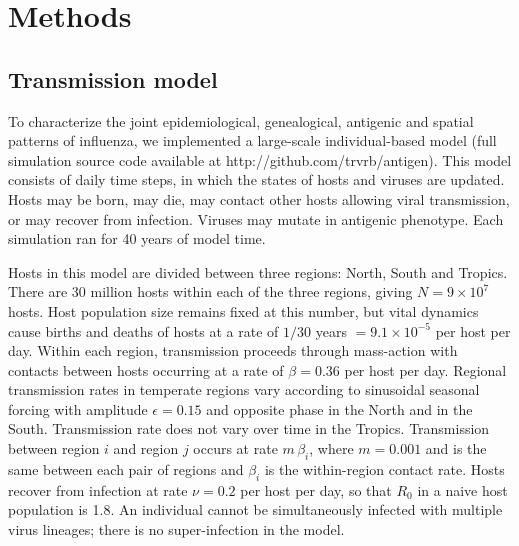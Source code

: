 \documentclass[11pt,oneside,letterpaper]{article}
\begin{document}
\section*{Methods}

\subsection*{Transmission model}

To characterize the joint epidemiological, genealogical, antigenic and spatial patterns of influenza, we implemented a large-scale individual-based model (full simulation source code available at http://github.com/trvrb/antigen).  This model consists of daily time steps, in which the states of hosts and viruses are updated.  Hosts may be born, may die, may contact other hosts allowing viral transmission, or may recover from infection.  Viruses may mutate in antigenic phenotype.  Each simulation ran for 40 years of model time.  

Hosts in this model are divided between three regions: North, South and Tropics.  There are 30 million hosts within each of the three regions, giving $N = 9 \times 10^{7}$ hosts.  Host population size remains fixed at this number, but vital dynamics cause births and deaths of hosts at a rate of $1 / 30$ years $= 9.1 \times 10^{-5}$ per host per day.  Within each region, transmission proceeds through mass-action with contacts between hosts occurring at a rate of $\beta = 0.36$ per host per day.  Regional transmission rates in temperate regions vary according to sinusoidal seasonal forcing with amplitude $\epsilon = 0.15$ and opposite phase in the North and in the South.  Transmission rate does not vary over time in the Tropics.  Transmission between region $i$ and region $j$ occurs at rate $m\,\beta_i$, where $m=0.001$ and is the same between each pair of regions and $\beta_i$ is the within-region contact rate.   Hosts recover from infection at rate $\nu = 0.2$ per host per day, so that $R_0$ in a naive host population is 1.8.  An individual cannot be simultaneously infected with multiple virus lineages; there is no super-infection in the model.
\end{document}
